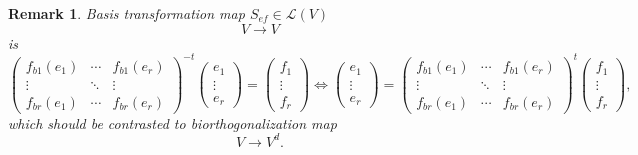 \documentclass[aps,preprint]{revtex4}
\newtheorem{remark}[theorem]{Remark}
\begin{document}
\begin{remark}
Basis transformation map $S_{ef}\in \mathcal{L}\left( V\right) $ 
\begin{equation}
V\rightarrow V
\end{equation}%
is 
\begin{equation}
\left( 
\begin{array}{ccc}
f_{b1}\left( e_{1}\right) & \cdots & f_{b1}\left( e_{r}\right) \\ 
\vdots & \ddots & \vdots \\ 
f_{br}\left( e_{1}\right) & \cdots & f_{br}\left( e_{r}\right)%
\end{array}%
\right) ^{-t}\left( 
\begin{array}{c}
e_{1} \\ 
\vdots \\ 
e_{r}%
\end{array}%
\right) =\left( 
\begin{array}{c}
f_{1} \\ 
\vdots \\ 
f_{r}%
\end{array}%
\right) \Leftrightarrow \left( 
\begin{array}{c}
e_{1} \\ 
\vdots \\ 
e_{r}%
\end{array}%
\right) =\left( 
\begin{array}{ccc}
f_{b1}\left( e_{1}\right) & \cdots & f_{b1}\left( e_{r}\right) \\ 
\vdots & \ddots & \vdots \\ 
f_{br}\left( e_{1}\right) & \cdots & f_{br}\left( e_{r}\right)%
\end{array}%
\right) ^{t}\left( 
\begin{array}{c}
f_{1} \\ 
\vdots \\ 
f_{r}%
\end{array}%
\right) ,
\end{equation}%
which should be contrasted to biorthogonalization 
map 
\begin{equation}
V\rightarrow V^{d}.
\end{equation}
\end{remark}
\end{document}

